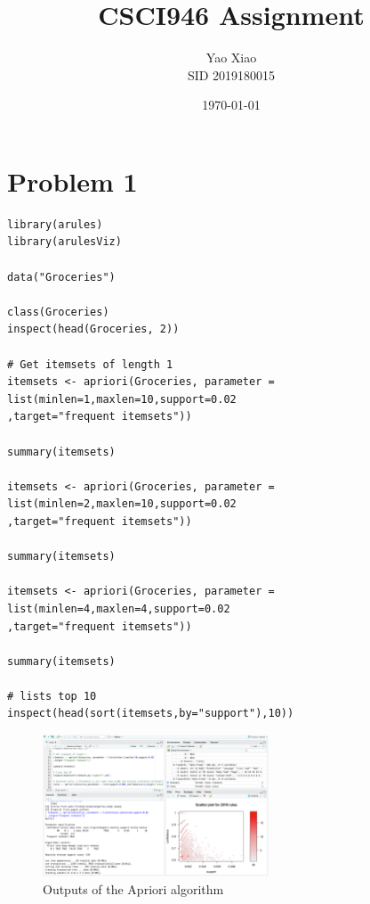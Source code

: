 \documentclass{article}
\title{CSCI946 Assignment}
\author{Yao Xiao \\ SID 2019180015}
\date{\today}
\begin{document}
\maketitle

\section{Problem 1}
\begin{lstlisting}
library(arules)
library(arulesViz)

data("Groceries")

class(Groceries)
inspect(head(Groceries, 2))

# Get itemsets of length 1
itemsets <- apriori(Groceries, parameter = list(minlen=1,maxlen=10,support=0.02
,target="frequent itemsets"))

summary(itemsets)

itemsets <- apriori(Groceries, parameter = list(minlen=2,maxlen=10,support=0.02
,target="frequent itemsets"))

summary(itemsets)

itemsets <- apriori(Groceries, parameter = list(minlen=4,maxlen=4,support=0.02
,target="frequent itemsets"))

summary(itemsets)

# lists top 10
inspect(head(sort(itemsets,by="support"),10))
\end{lstlisting}

\begin{figure}[H]
  \centering
  \caption{Outputs of the Apriori algorithm}
  \includegraphics[width=0.6\textwidth]{Fig0}
\end{figure}
\end{document}
